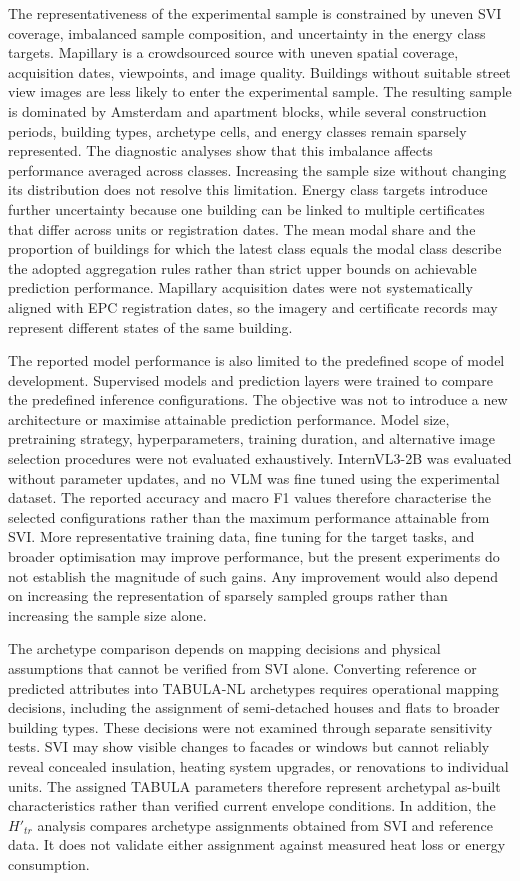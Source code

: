 The representativeness of the experimental sample is constrained by uneven SVI coverage, imbalanced sample composition, and uncertainty in the energy class targets.
Mapillary is a crowdsourced source with uneven spatial coverage, acquisition dates, viewpoints, and image quality.
Buildings without suitable street view images are less likely to enter the experimental sample.
The resulting sample is dominated by Amsterdam and apartment blocks, while several construction periods, building types, archetype cells, and energy classes remain sparsely represented.
The diagnostic analyses show that this imbalance affects performance averaged across classes.
Increasing the sample size without changing its distribution does not resolve this limitation.
Energy class targets introduce further uncertainty because one building can be linked to multiple certificates that differ across units or registration dates.
The mean modal share and the proportion of buildings for which the latest class equals the modal class describe the adopted aggregation rules rather than strict upper bounds on achievable prediction performance.
Mapillary acquisition dates were not systematically aligned with EPC registration dates, so the imagery and certificate records may represent different states of the same building.

The reported model performance is also limited to the predefined scope of model development.
Supervised models and prediction layers were trained to compare the predefined inference configurations.
The objective was not to introduce a new architecture or maximise attainable prediction performance.
Model size, pretraining strategy, hyperparameters, training duration, and alternative image selection procedures were not evaluated exhaustively.
InternVL3-2B was evaluated without parameter updates, and no \ac{VLM} was fine tuned using the experimental dataset.
The reported accuracy and macro F1 values therefore characterise the selected configurations rather than the maximum performance attainable from \ac{SVI}.
More representative training data, fine tuning for the target tasks, and broader optimisation may improve performance, but the present experiments do not establish the magnitude of such gains.
Any improvement would also depend on increasing the representation of sparsely sampled groups rather than increasing the sample size alone.

The archetype comparison depends on mapping decisions and physical assumptions that cannot be verified from \ac{SVI} alone.
Converting reference or predicted attributes into TABULA-NL archetypes requires operational mapping decisions, including the assignment of semi-detached houses and flats to broader building types.
These decisions were not examined through separate sensitivity tests.
\Ac{SVI} may show visible changes to facades or windows but cannot reliably reveal concealed insulation, heating system upgrades, or renovations to individual units.
The assigned TABULA parameters therefore represent archetypal as-built characteristics rather than verified current envelope conditions.
In addition, the $H'_{tr}$ analysis compares archetype assignments obtained from \ac{SVI} and reference data.
It does not validate either assignment against measured heat loss or energy consumption.

